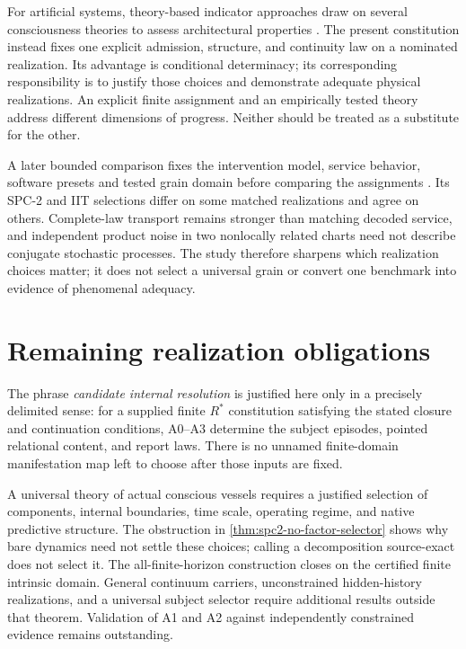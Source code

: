 For artificial systems, theory-based indicator approaches draw on several consciousness theories to assess architectural properties \cite{Butlin2023}. The present constitution instead fixes one explicit admission, structure, and continuity law on a nominated realization. Its advantage is conditional determinacy; its corresponding responsibility is to justify those choices and demonstrate adequate physical realizations. An explicit finite assignment and an empirically tested theory address different dimensions of progress. Neither should be treated as a substitute for the other.

A later bounded comparison fixes the intervention model, service behavior, software presets and tested grain domain before comparing the assignments \cite{RodgersInterventional2026}. Its SPC-2 and IIT selections differ on some matched realizations and agree on others. Complete-law transport remains stronger than matching decoded service, and independent product noise in two nonlocally related charts need not describe conjugate stochastic processes. The study therefore sharpens which realization choices matter; it does not select a universal grain or convert one benchmark into evidence of phenomenal adequacy.

\section{Remaining realization obligations}\label{section:resolution:internal-completeness-and-remaining-realization-obligations}
The phrase \emph{candidate internal resolution} is justified here only in a precisely delimited sense: for a supplied finite $R^\ast$ constitution satisfying the stated closure and continuation conditions, A0--A3 determine the subject episodes, pointed relational content, and report laws. There is no unnamed finite-domain manifestation map left to choose after those inputs are fixed.

A universal theory of actual conscious vessels requires a justified selection of components, internal boundaries, time scale, operating regime, and native predictive structure. The obstruction in \cref{thm:spc2-no-factor-selector} shows why bare dynamics need not settle these choices; calling a decomposition source-exact does not select it. The all-finite-horizon construction closes on the certified finite intrinsic domain. General continuum carriers, unconstrained hidden-history realizations, and a universal subject selector require additional results outside that theorem. Validation of A1 and A2 against independently constrained evidence remains outstanding.

